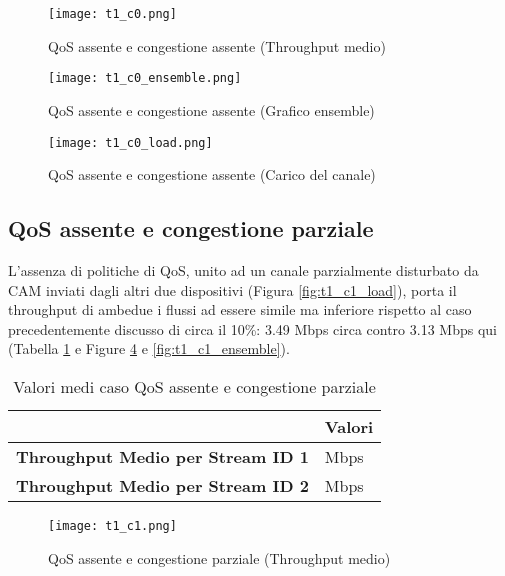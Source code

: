 \begin{figure}[h!]
    \centering
    \texttt{[image: t1\_c0.png]}
    \caption{QoS assente e congestione assente (Throughput medio)}
    \label{fig:t1_c0}
\end{figure}

\begin{figure}[h!]
    \centering
    \texttt{[image: t1\_c0\_ensemble.png]}
    \caption{QoS assente e congestione assente (Grafico ensemble)}
    \label{fig:t1_c0_ensemble}
\end{figure}
\clearpage
\begin{figure}[h!]
    \centering
    \texttt{[image: t1\_c0\_load.png]}
    \caption{QoS assente e congestione assente (Carico del canale)}
    \label{fig:t1_c0_load}
\end{figure}

\subsection[QoS assente e congestione parziale]{QoS assente e congestione parziale}
L'assenza di politiche di QoS, unito ad un canale parzialmente disturbato da CAM inviati dagli altri due dispositivi (Figura \ref{fig:t1_c1_load}), porta il throughput di ambedue i flussi ad essere simile ma inferiore rispetto al caso precedentemente discusso di circa il 10\%: 3.49 Mbps circa contro 3.13 Mbps qui (Tabella \ref{table:7} e Figure \ref{fig:t1_c1} e \ref{fig:t1_c1_ensemble}).

\begin{table}[h!]
    \centering
    \begin{tabular}{|>{\centering\arraybackslash}p{20em}|>{\centering\arraybackslash}p{7em}|} 
     \hline
     \textbf{} & \textbf{Valori} \\ 
     \hline
     \textbf{Throughput Medio per Stream ID 1} & 3.13 Mbps \\ 
     \hline
     \textbf{Throughput Medio per Stream ID 2} & 3.13 Mbps \\
     \hline
    \end{tabular}
    \caption{Valori medi caso QoS assente e congestione parziale}
    \label{table:7}
\end{table}

\begin{figure}[h!]
    \centering
    \texttt{[image: t1\_c1.png]}
    \caption{QoS assente e congestione parziale (Throughput medio)}
    \label{fig:t1_c1}
\end{figure}

